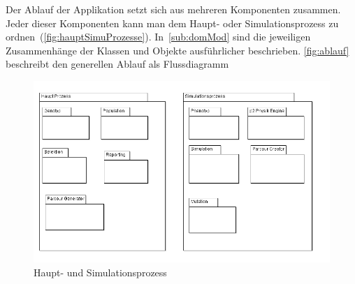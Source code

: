     Der Ablauf der Applikation setzt sich aus mehreren Komponenten zusammen.
    Jeder dieser Komponenten kann man dem Haupt- oder Simulationsprozess zu ordnen~(\vref{fig:hauptSimuProzesse}).
    In~\vref{sub:domMod} sind die jeweiligen Zusammenhänge der Klassen und Objekte ausführlicher beschrieben.
    \vref{fig:ablauf} beschreibt den generellen Ablauf als Flussdiagramm
    \begin{figure}[H]
      \includegraphics[scale=0.45]{graphics/haupt_simulations_prozess}
      \caption{Haupt- und Simulationsprozess\label{fig:hauptSimuProzesse}}
    \end{figure}
